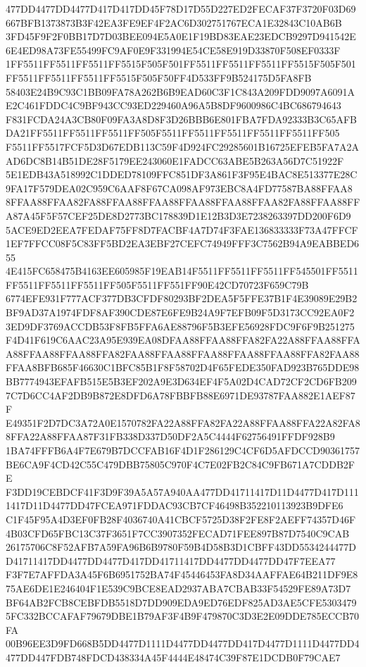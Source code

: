 \documentclass[UTF8,fontset=fandol,zihao=-4,a4paper]{ctexart}
\begin{document}
{{477DD4477DD4477D417D417DD45F78D17D55D227ED2FECAF37F3720F03D69667BFB1373873B3F42EA3FE9EF4F2AC6D302751767ECA1E32843C10AB6B
3FD45F9F2F0BB17D7D03BEE094E5A0E1F19BD83EAE23EDCB9297D941542E6E4ED98A73FE55499FC9AF0E9F331994E54CE58E919D33870F508EF0333F
1FF5511FF5511FF5511FF5515F505F501FF5511FF5511FF5511FF5515F505F501FF5511FF5511FF5511FF5515F505F50FF4D533FF9B524175D5FA8FB
58403E24B9C93C1BB09FA78A262B6B9EAD60C3F1C843A209FDD9097A6091AE2C461FDDC4C9BF943CC93ED229460A96A5B8DF9600986C4BC686794643
F831FCDA24A3CB80F09FA3A8D8F3D26BBB6E801FBA7FDA92333B3C65AFBDA21FF5511FF5511FF5511FF505F5511FF5511FF5511FF5511FF5511FF505
F5511FF5517FCF5D3D67EDB113C59F4D924FC29285601B16725EFEB5FA7A2AAD6DC8B14B51DE28F5179EE243060E1FADCC63ABE5B263A56D7C51922F
5E1EDB43A518992C1DDED78109FFC851DF3A861F3F95E4BAC8E513377E28C9FA17F579DEA02C959C6AAF8F67CA098AF973EBC8A4FD77587BA88FFAA8
8FFAA88FFAA82FA88FFAA88FFAA88FFAA88FFAA88FFAA82FA88FFAA88FFA87A45F5F57CEF25DE8D2773BC178839D1E12B3D3E7238263397DD200F6D9
5ACE9ED2EEA7FEDAF75FF8D7FACBF4A7D74F3FAE136833333F73A47FFCF1EF7FFCC08F5C83FF5BD2EA3EBF27CEFC74949FFF3C7562B94A9EABBED655
4E415FC658475B4163EE605985F19EAB14F5511FF5511FF5511FF545501FF5511FF5511FF5511FF5511FF505F5511FF551FF90E42CD70723F659C79B
6774EFE931F777ACF377DB3CFDF80293BF2DEA5F5FFE37B1F4E39089E29B2BF9AD37A1974FDF8AF390CDE87E6FE9B24A9F7EFB09F5D3173CC92EA0F2
3ED9DF3769ACCDB53F8FB5FFA6AE88796F5B3EFE56928FDC9F6F9B251275F4D41F619C6AAC23A95E939EA08DFAA88FFAA88FFA82FA22A88FFAA88FFA
A88FFAA88FFAA88FFA82FAA88FFAA88FFAA88FFAA88FFAA88FFA82FAA88FFAA8BFB685F46630C1BFC85B1F8F58702D4F65FEDE350FAD923B765DDE98
BB7774943EFAFB515E5B3EF202A9E3D634EF4F5A02D4CAD72CF2CD6FB2097C7D6CC4AF2DB9B872E8DFD6A78FBBFB88E6971DE93787FAA882E1AEF87F
E49351F2D7DC3A72A0E1570782FA22A88FFA82FA22A88FFAA88FFA22A82FA88FFA22A88FFAA87F31FB338D337D50DF2A5C4444F62756491FFDF928B9
1BA74FFFB6A4F7E679B7DCCFAB16F4D1F286129C4CF6D5AFDCCD90361757BE6CA9F4CD42C55C479DBB75805C970F4C7E02FB2C84C9FB671A7CDDB2FE
F3DD19CEBDCF41F3D9F39A5A57A940AA477DD41711417D11D4477D417D1111417D11D4477DD47FCEA971FDDAC93CB7CF46498B352210113923B9DFE6
C1F45F95A4D3EF0FB28F4036740A41CBCF5725D38F2FE8F2AEFF74357D46F4B03CFD65FBC13C37F3651F7CC3907352FECAD71FEE897B87D7540C9CAB
26175706C8F52AFB7A59FA96B6B9780F59B4D58B3D1CBFF43DD5534244477DD41711417DD4477DD4477D417DD41711417DD4477DD4477DD47F7EEA77
F3F7E7AFFDA3A45F6B6951752BA74F45446453FA8D34AAFFAE64B211DF9E875AE6DE1E246404F1E539C9BCE8EAD2937ABA7CBAB33F54529FE89A73D7
BF64AB2FCB8CEBFDB5518D7DD909EDA9ED76EDF825AD3AE5CFE53034795FC332BCCAFAF79679DBE1B79AF3F4B9F479870C3D3E2E09DDE785ECCB70FA
00B96EE3D9FD668B5DD4477D1111D4477DD4477DD417D4477D1111D4477DD4477DD447FDB748FDCD438334A45F4444E48474C39F87E1DCDB0F79CAE7
}}
\end{document}
